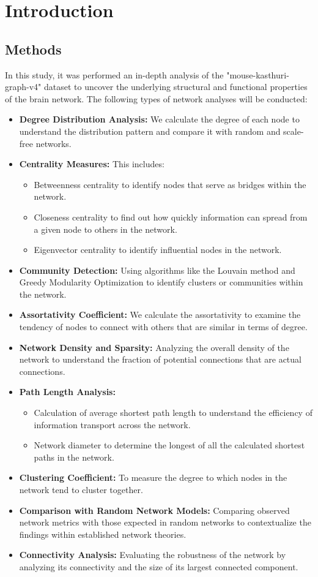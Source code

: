 \documentclass[
	report, %
	11pt, %
]{CSUniSchoolLabReport}
\begin{document}
\section{Introduction}
	\subsection{Methods}
		In this study, it was performed an in-depth analysis of the "mouse-kasthuri-graph-v4" dataset to uncover the underlying structural and functional properties of the brain network. The following types of network analyses will be conducted:
		\vspace{10pt}
		\begin{itemize}
		\item \textbf{Degree Distribution Analysis:} We calculate the degree of each node to understand the distribution pattern and compare it with random and scale-free networks.
		\item \textbf{Centrality Measures:} This includes:
		\begin{itemize}
			\item Betweenness centrality to identify nodes that serve as bridges within the network.
			\item Closeness centrality to find out how quickly information can spread from a given node to others in the network.
			\item Eigenvector centrality to identify influential nodes in the network.
		\end{itemize}
		\item \textbf{Community Detection:} Using algorithms like the Louvain method and Greedy Modularity Optimization to identify clusters or communities within the network.
		\item \textbf{Assortativity Coefficient:} We calculate the assortativity to examine the tendency of nodes to connect with others that are similar in terms of degree.
		\item \textbf{Network Density and Sparsity:} Analyzing the overall density of the network to understand the fraction of potential connections that are actual connections.
		\item \textbf{Path Length Analysis:}
		\begin{itemize}
			\item Calculation of average shortest path length to understand the efficiency of information transport across the network.
			\item Network diameter to determine the longest of all the calculated shortest paths in the network.
		\end{itemize}
		\item \textbf{Clustering Coefficient:} To measure the degree to which nodes in the network tend to cluster together.
		\item \textbf{Comparison with Random Network Models:} Comparing observed network metrics with those expected in random networks to contextualize the findings within established network theories.
		\item \textbf{Connectivity Analysis:} Evaluating the robustness of the network by analyzing its connectivity and the size of its largest connected component.
		\end{itemize}
\end{document}
